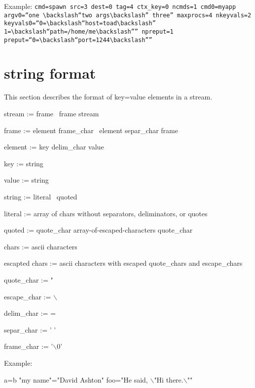 \documentclass[dvipdfm,11pt]{article}
\begin{document}
Example: \texttt{cmd=spawn src=3 dest=0 tag=4 ctx\_key=0 ncmds=1 cmd0=myapp
argv0=``one $\backslash$``two args$\backslash$'' three'' maxprocs=4 
nkeyvals=2 keyvals0=``0=$\backslash$``host=toad$\backslash$'' 
1=$\backslash$``path=/home/me$\backslash$'''' 
npreput=1 preput=``0=$\backslash$``port=1244$\backslash$''''}

\section{string format}
This section describes the format of key=value elements in a stream.

stream := frame \vline\ frame stream

frame := element frame\_char \vline\ element separ\_char frame

element := key delim\_char value

key := string

value := string

string := literal \vline\ quoted

literal := array of chars without separators, deliminators, or quotes

quoted := quote\_char array-of-escaped-characters quote\_char

chars := ascii characters

escapted chars := ascii characters with escaped quote\_chars and escape\_chars

quote\_char := "

escape\_char := $\backslash$

delim\_char := =

separ\_char := ' '

frame\_char := '$\backslash$0'

Example:

	a=b "my name"="David Ashton" foo="He said, $\backslash$"Hi there.$\backslash$""
	


\end{document}
